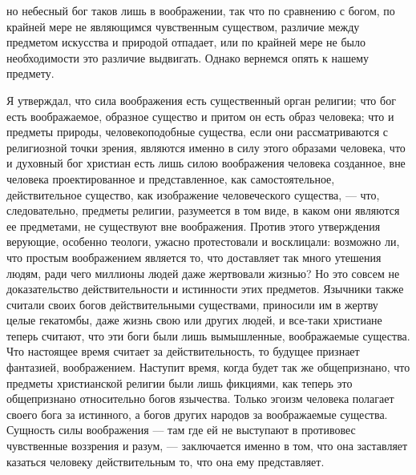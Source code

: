 \documentclass[12pt]{article}
\begin{document}
но небесный бог таков лишь в воображении, так что по сравнению с богом, по крайней мере не являющимся чувственным существом, различие между предметом искусства и природой отпадает, или по крайней мере не было необходимости это различие выдвигать. Однако вернемся опять к нашему предмету. 

Я утверждал, что сила воображения есть существенный орган религии; что бог есть воображаемое, образное существо и притом он есть образ человека; что и предметы природы, человекоподобные существа, если они рассматриваются с религиозной точки зрения, являются именно в силу этого образами человека, что и духовный бог христиан есть лишь силою воображения человека созданное, вне человека проектированное и представленное, как самостоятельное, действительное существо, как изображение человеческого существа, --- что, следовательно, предметы религии, разумеется в том виде, в каком они являются ее предметами, не существуют вне воображения. Против этого утверждения верующие, особенно теологи, ужасно протестовали и восклицали: возможно ли, что простым воображением является то, что доставляет так много утешения людям, ради чего миллионы людей даже жертвовали жизнью? Но это совсем не доказательство действительности и истинности этих предметов. Язычники также считали своих богов действительными существами, приносили им в жертву целые гекатомбы, даже жизнь свою или других людей, и все-таки христиане теперь считают, что эти боги были лишь вымышленные, воображаемые существа. Что настоящее время считает за действительность, то будущее признает фантазией, воображением. Наступит время, когда будет так же общепризнано, что предметы христианской религии были лишь фикциями, как теперь это общепризнано относительно богов язычества. Только эгоизм человека полагает своего бога за истинного, а богов других народов за воображаемые существа. Сущность силы воображения --- там где ей не выступают в противовес чувственные воззрения и разум, --- заключается именно в том, что она заставляет казаться человеку действительным то, что она ему представляет. 
\end{document}
